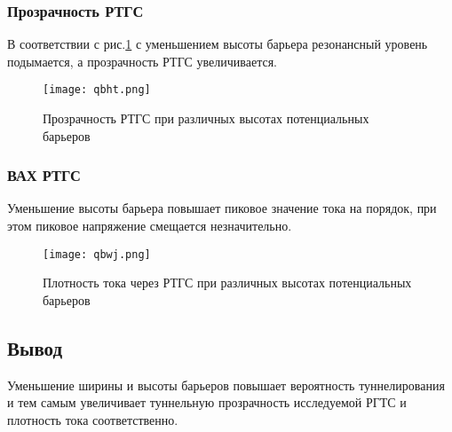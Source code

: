 \subsubsection{Прозрачность РТГС}

В соответствии с рис.\ref{fig:qbht} с уменьшением высоты барьера резонансный уровень подымается, а прозрачность РТГС увеличивается.

\begin{figure}[h!]
	\centering
	\texttt{[image: qbht.png]}
	\caption{Прозрачность РТГС при различных высотах потенциальных барьеров}
	\label{fig:qbht}
\end{figure}

\subsubsection{ВАХ РТГС}
Уменьшение высоты барьера повышает пиковое значение тока на порядок, при этом пиковое напряжение смещается незначительно.
\begin{figure}[h!]
	\centering
	\texttt{[image: qbwj.png]}
	\caption{Плотность тока через РТГС при различных высотах потенциальных барьеров}
	\label{fig:qbwj}
\end{figure}

\subsection{Вывод}
Уменьшение ширины и высоты барьеров повышает вероятность туннелирования и тем самым увеличивает туннельную прозрачность исследуемой РГТС и плотность тока соответственно.
